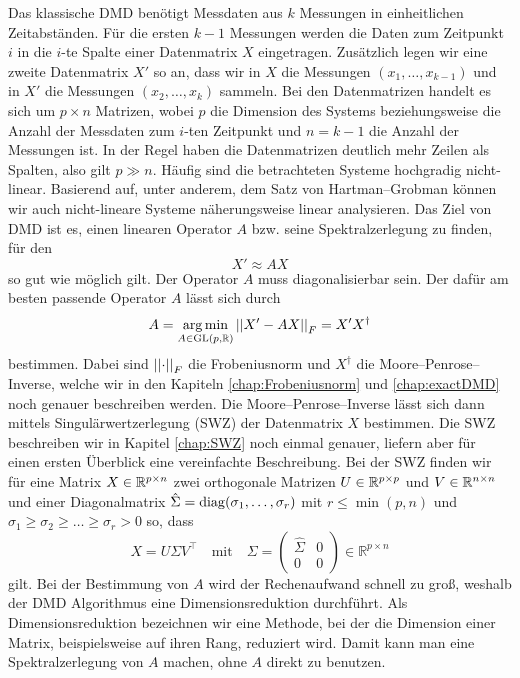 \documentclass[../Bachelor_LennartKoliwer.tex]{subfiles}
\begin{document}
Das klassische DMD benötigt Messdaten aus $k$ Messungen in einheitlichen Zeitabständen.
Für die ersten $k-1$ Messungen werden die Daten zum Zeitpunkt $i$ in die $i$-te Spalte einer Datenmatrix $X$ eingetragen.
Zusätzlich legen wir eine zweite Datenmatrix $X'$ so an, dass wir in $X$ die Messungen $(x_1,\dots,x_{k-1})$ und in $X'$ die Messungen $(x_2,\dots,x_{k})$ sammeln.
Bei den Datenmatrizen handelt es sich um $p\times n$ Matrizen, wobei $p$ die Dimension des Systems beziehungsweise die Anzahl der Messdaten zum $i$-ten Zeitpunkt und $n=k-1$ die Anzahl der Messungen ist.
In der Regel haben die Datenmatrizen deutlich mehr Zeilen als Spalten, also gilt $p\gg n$.
Häufig sind die betrachteten Systeme hochgradig nicht-linear.
Basierend auf, unter anderem, dem Satz von Hartman--Grobman können wir auch nicht-lineare Systeme näherungsweise linear analysieren. %
Das Ziel von DMD ist es, einen linearen Operator $A$ bzw. seine Spektralzerlegung zu finden, für den 
\[
    X' \approx AX
\]
so gut wie möglich gilt. 
Der Operator $A$ muss diagonalisierbar sein.
Der dafür am besten passende Operator $A$ lässt sich durch 
\[
    A=\underset{A\in\text{GL}(p,\mathbb{R})}{\arg\min}\left\vert\left\vert X'-AX \right\vert\right\vert_F=X'X^\dag
\] 
bestimmen. Dabei sind $\left\vert\left\vert \cdot \right\vert\right\vert_F$ die Frobeniusnorm und $X^\dag$ die Moore--Penrose--Inverse, welche wir in den Kapiteln \ref{chap:Frobeniusnorm} und \ref{chap:exactDMD} noch genauer beschreiben werden. 
Die Moore--Penrose--Inverse lässt sich dann mittels Singulärwertzerlegung (SWZ) der Datenmatrix $X$ bestimmen. 
Die SWZ beschreiben wir in Kapitel \ref{chap:SWZ} noch einmal genauer, liefern aber für einen ersten Überblick eine vereinfachte Beschreibung.
Bei der SWZ finden wir für eine Matrix $X\in\mathbb{R}^{p\times n}$ zwei orthogonale Matrizen $U\in\mathbb{R}^{p\times p}$ und $V\in\mathbb{R}^{n\times n}$  und einer Diagonalmatrix  ${\hat{\Sigma}=\operatorname{diag}(\sigma_1,\dots,\sigma_r)}$ mit $r\leq\min(p,n)$ und $\sigma_1 \geq \sigma_2 \geq \dots \geq \sigma_r > 0$ so, dass
\[
    X = U\Sigma V^\top \quad\text{mit}\quad \Sigma = \begin{pmatrix}
        \hat{\Sigma} & 0 \\
        0            & 0
    \end{pmatrix} \in \mathbb{R}^{p\times n}
\]
gilt.
Bei der Bestimmung von $A$ wird der Rechenaufwand schnell zu groß, weshalb der DMD Algorithmus eine Dimensionsreduktion durchführt. 
Als Dimensionsreduktion bezeichnen wir eine Methode, bei der die Dimension einer Matrix, beispielsweise auf ihren Rang, reduziert wird.
Damit kann man eine Spektralzerlegung von $A$ machen, ohne $A$ direkt zu benutzen. 
\end{document}
